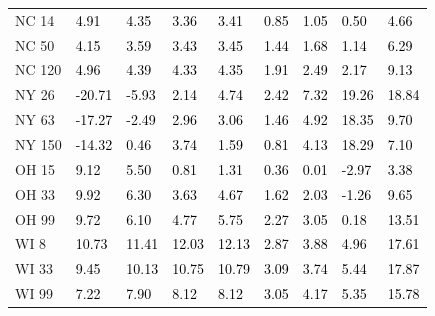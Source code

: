 \begin{tabular}{lllllllll}
NC 14 & \textcolor{black}{ 4.91 } & \textcolor{black}{ 4.35 } & \textcolor{black}{ 3.36 } & \textcolor{black}{ 3.41 } & \textcolor{black}{ 0.85 } & \textcolor{black}{ 1.05 } & \textcolor{black}{ 0.50 } & \textcolor{black}{ 4.66 } \\
NC 50 & \textcolor{black}{ 4.15 } & \textcolor{black}{ 3.59 } & \textcolor{black}{ 3.43 } & \textcolor{black}{ 3.45 } & \textcolor{black}{ 1.44 } & \textcolor{black}{ 1.68 } & \textcolor{black}{ 1.14 } & \textcolor{black}{ 6.29 } \\
NC 120 & \textcolor{black}{ 4.96 } & \textcolor{black}{ 4.39 } & \textcolor{black}{ 4.33 } & \textcolor{black}{ 4.35 } & \textcolor{black}{ 1.91 } & \textcolor{black}{ 2.49 } & \textcolor{black}{ 2.17 } & \textcolor{black}{ 9.13 } \\
NY 26 & \textcolor{black}{ -20.71 } & \textcolor{black}{ -5.93 } & \textcolor{black}{ 2.14 } & \textcolor{black}{ 4.74 } & \textcolor{black}{ 2.42 } & \textcolor{black}{ 7.32 } & \textcolor{black}{ 19.26 } & \textcolor{black}{ 18.84 } \\
NY 63 & \textcolor{black}{ -17.27 } & \textcolor{black}{ -2.49 } & \textcolor{black}{ 2.96 } & \textcolor{black}{ 3.06 } & \textcolor{black}{ 1.46 } & \textcolor{black}{ 4.92 } & \textcolor{black}{ 18.35 } & \textcolor{black}{ 9.70 } \\
NY 150 & \textcolor{black}{ -14.32 } & \textcolor{black}{ 0.46 } & \textcolor{black}{ 3.74 } & \textcolor{black}{ 1.59 } & \textcolor{black}{ 0.81 } & \textcolor{black}{ 4.13 } & \textcolor{black}{ 18.29 } & \textcolor{black}{ 7.10 } \\
OH 15 & \textcolor{black}{ 9.12 } & \textcolor{black}{ 5.50 } & \textcolor{black}{ 0.81 } & \textcolor{black}{ 1.31 } & \textcolor{black}{ 0.36 } & \textcolor{black}{ 0.01 } & \textcolor{black}{ -2.97 } & \textcolor{black}{ 3.38 } \\
OH 33 & \textcolor{black}{ 9.92 } & \textcolor{black}{ 6.30 } & \textcolor{black}{ 3.63 } & \textcolor{black}{ 4.67 } & \textcolor{black}{ 1.62 } & \textcolor{black}{ 2.03 } & \textcolor{black}{ -1.26 } & \textcolor{black}{ 9.65 } \\
OH 99 & \textcolor{black}{ 9.72 } & \textcolor{black}{ 6.10 } & \textcolor{black}{ 4.77 } & \textcolor{black}{ 5.75 } & \textcolor{black}{ 2.27 } & \textcolor{black}{ 3.05 } & \textcolor{black}{ 0.18 } & \textcolor{black}{ 13.51 } \\
WI 8 & \textcolor{black}{ 10.73 } & \textcolor{black}{ 11.41 } & \textcolor{black}{ 12.03 } & \textcolor{black}{ 12.13 } & \textcolor{black}{ 2.87 } & \textcolor{black}{ 3.88 } & \textcolor{black}{ 4.96 } & \textcolor{black}{ 17.61 } \\
WI 33 & \textcolor{black}{ 9.45 } & \textcolor{black}{ 10.13 } & \textcolor{black}{ 10.75 } & \textcolor{black}{ 10.79 } & \textcolor{black}{ 3.09 } & \textcolor{black}{ 3.74 } & \textcolor{black}{ 5.44 } & \textcolor{black}{ 17.87 } \\
WI 99 & \textcolor{black}{ 7.22 } & \textcolor{black}{ 7.90 } & \textcolor{black}{ 8.12 } & \textcolor{black}{ 8.12 } & \textcolor{black}{ 3.05 } & \textcolor{black}{ 4.17 } & \textcolor{black}{ 5.35 } & \textcolor{black}{ 15.78 } \\
\bottomrule
\end{tabular}
